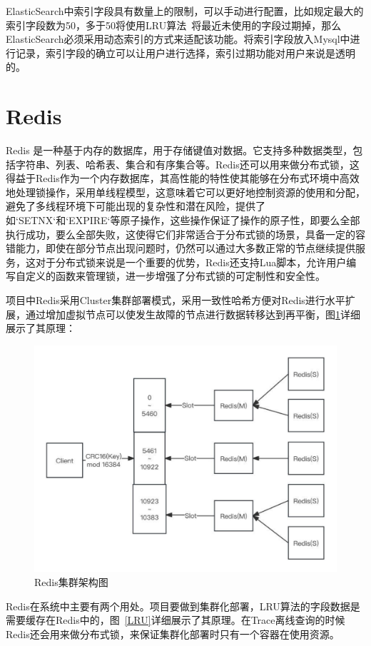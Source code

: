 ElasticSearch中索引字段具有数量上的限制，可以手动进行配置，比如规定最大的索引字段数为50，多于50将使用LRU算法~\cite{阳慧2004lru}将最近未使用的字段过期掉，那么ElasticSearch必须采用动态索引的方式来适配该功能。将索引字段放入Mysql中进行记录，索引字段的确立可以让用户进行选择，索引过期功能对用户来说是透明的。

\section{Redis}  
Redis 是一种基于内存的数据库，用于存储键值对数据。它支持多种数据类型，包括字符串、列表、哈希表、集合和有序集合等。Redis还可以用来做分布式锁，这得益于Redis作为一个内存数据库，其高性能的特性使其能够在分布式环境中高效地处理锁操作，采用单线程模型，这意味着它可以更好地控制资源的使用和分配，避免了多线程环境下可能出现的复杂性和潜在风险，提供了如`SETNX`和`EXPIRE`等原子操作，这些操作保证了操作的原子性，即要么全部执行成功，要么全部失败，这使得它们非常适合于分布式锁的场景，具备一定的容错能力，即使在部分节点出现问题时，仍然可以通过大多数正常的节点继续提供服务，这对于分布式锁来说是一个重要的优势，Redis还支持Lua脚本，允许用户编写自定义的函数来管理锁，进一步增强了分布式锁的可定制性和安全性。

项目中Redis采用Cluster集群部署模式，采用一致性哈希方便对Redis进行水平扩展，通过增加虚拟节点可以使发生故障的节点进行数据转移达到再平衡，图\ref{redis}详细展示了其原理：
\begin{figure}[htb]
  \centering
  \includegraphics[width=5in]{figure/chapter2/Redis集群架构图.pdf}
  \caption{Redis集群架构图}\label{redis}
\end{figure}

Redis在系统中主要有两个用处。项目要做到集群化部署，LRU算法的字段数据是需要缓存在Redis中的，图~\ref{LRU}详细展示了其原理。在Trace离线查询的时候Redis还会用来做分布式锁，来保证集群化部署时只有一个容器在使用资源。

